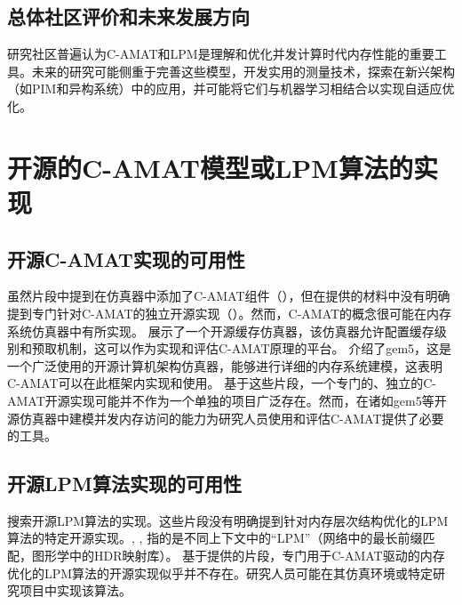 \documentclass[UTF8]{ctexart}
\begin{document}
\subsection{总体社区评价和未来发展方向}
研究社区普遍认为C-AMAT和LPM是理解和优化并发计算时代内存性能的重要工具\cite{sun2018optimizing}。未来的研究可能侧重于完善这些模型，开发实用的测量技术，探索在新兴架构（如PIM和异构系统）中的应用，并可能将它们与机器学习相结合以实现自适应优化\cite{mitLPMAI}。

\section{开源的C-AMAT模型或LPM算法的实现}

\subsection{开源C-AMAT实现的可用性}
虽然片段中提到在仿真器中添加了C-AMAT组件（\cite{sunMemoryPdf}），但在提供的材料中没有明确提到专门针对C-AMAT的独立开源实现（\cite{sourceforgeC}）。然而，C-AMAT的概念很可能在内存系统仿真器中有所实现。
\cite{githubCacheSim}展示了一个开源缓存仿真器，该仿真器允许配置缓存级别和预取机制，这可以作为实现和评估C-AMAT原理的平台。
\cite{gem5Intro}介绍了gem5，这是一个广泛使用的开源计算机架构仿真器，能够进行详细的内存系统建模，这表明C-AMAT可以在此框架内实现和使用。
基于这些片段，一个专门的、独立的C-AMAT开源实现可能并不作为一个单独的项目广泛存在。然而，在诸如gem5等开源仿真器中建模并发内存访问的能力为研究人员使用和评估C-AMAT提供了必要的工具。

\subsection{开源LPM算法实现的可用性}
搜索开源LPM算法的实现。这些片段没有明确提到针对内存层次结构优化的LPM算法的特定开源实现。\cite{goLPM}, \cite{amdFidelityFXLPM}, \cite{githubLiblpm}指的是不同上下文中的“LPM”（网络中的最长前缀匹配，图形学中的HDR映射库）。
基于提供的片段，专门用于C-AMAT驱动的内存优化的LPM算法的开源实现似乎并不存在。研究人员可能在其仿真环境或特定研究项目中实现该算法。
\end{document}
